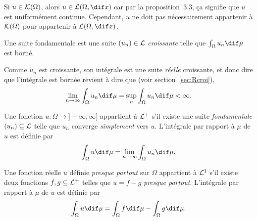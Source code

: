 Si $u \in \mathcal{K}(\Omega)$, alors $u \in \Le(\Omega,\dif x)$ car par la proposition~3.3,
ça signifie que $u$ est uniformément continue.
Cependant, $u$ ne doit pas nécessairement appartenir à $\mathcal{K}(\Omega)$ pour
appartenir à $\Le(\Omega,\dif x)$.

\begin{mydef}
  Une suite fondamentale est une suite $(u_n) \in \mathcal{L}$ \emph{croissante} telle que
  $\int_\Omega u_n \dif \mu$ est borné.
\end{mydef}

Comme $u_n$ est croissante, son intégrale est une suite \emph{réelle} croissante,
et donc dire que l'intégrale est bornée revient à dire que (voir section~\ref{sec:Rcroi}),
\[ \lim_{n\to\infty} \int_\Omega u_n \dif \mu = \sup_n \int_\Omega u_n \dif \mu < \infty. \]

\begin{mydef}[6.8]
  Une fonction $u : \Omega \to ]-\infty,\infty]$ appartient à $\mathcal{L}^+$ s'il existe
  une suite \emph{fondamentale} $(u_n) \subseteq \mathcal{L}$ telle que $u_n$ converge
  \emph{simplement} vers $u$.
  L'intégrale par rapport à $\mu$ de $u$ est définie par
  \[ \int_\Omega u \dif \mu = \lim_{n\to\infty} \int_\Omega u_n \dif \mu. \]
\end{mydef}

\begin{mydef}[6.12]
  Une fonction réelle $u$ définie \emph{presque partout} sur $\Omega$
  appartient à $\mathcal{L}^1$ s'il existe
  deux fonctions $f,g \subseteq \mathcal{L}^+$ telles que $u = f - g$ \emph{presque partout}.
  L'intégrale par rapport à $\mu$ de $u$ est définie par
  \[ \int_\Omega u \dif \mu = \int_\Omega f \dif \mu - \int_\Omega g \dif \mu. \]
\end{mydef}


